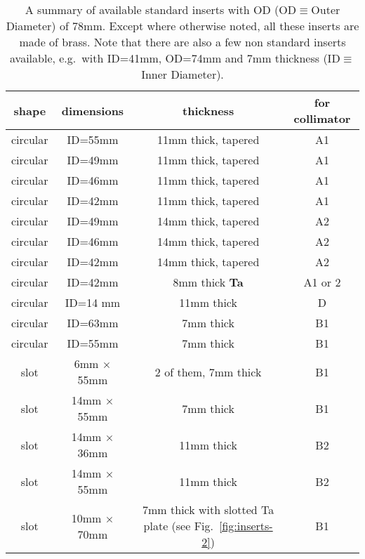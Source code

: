 \documentclass[11pt]{report}
\begin{document}
\begin{table}[!ht]
\centering
\begin{tabular}{c|c|c|c}
\hline
shape & dimensions &  thickness & for collimator \\
\hline
\hline
circular    & ID=55mm     &  11mm thick, tapered   & A1\\
circular    & ID=49mm     &  11mm thick, tapered   & A1\\
circular    & ID=46mm     &  11mm thick, tapered   & A1\\
circular    & ID=42mm     &  11mm thick, tapered   & A1\\
\hline
circular    & ID=49mm     &  14mm thick, tapered   & A2\\
circular    & ID=46mm     &  14mm thick, tapered   & A2\\
circular    & ID=42mm     &  14mm thick, tapered   & A2\\
\hline
circular    & ID=42mm     &  8mm thick {\bf Ta}          & A1 or 2\\
\hline
circular    & ID=14 mm    &  11mm thick             & D \\
\hline
circular    & ID=63mm     &  7mm thick             & B1\\
circular    & ID=55mm     &  7mm thick             & B1\\
slot        & 6mm $\times$ 55mm   &  2 of them, 7mm thick     & B1 \\
slot        & 14mm $\times$ 55mm  &  7mm thick     & B1 \\
\hline
slot        & 14mm $\times$ 36mm  &  11mm thick    & B2 \\
slot        & 14mm $\times$ 55mm  &  11mm thick    & B2 \\
\hline
slot & 10mm $\times$ 70mm &  7mm thick with slotted Ta plate (see Fig.~\ref{fig:inserts-2}) &  B1 \\
\hline
\hline
\end{tabular}
\caption{A summary of available standard inserts with OD (OD$\equiv$Outer Diameter) of 78mm. 
Except where otherwise noted, all these inserts are made of brass.
Note that there are also a few non standard inserts available, e.g.~with ID=41mm, OD=74mm and 7mm thickness
(ID$\equiv$Inner Diameter). }
\label{table:inserts}
\end{table}
\end{document}
